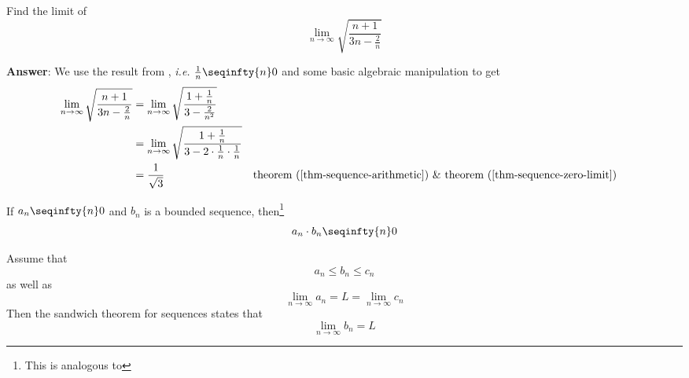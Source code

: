 \begin{exm}\label{exm-sequence-arithmetic:2}
	Find the limit of
	\begin{equation*}
		\lim_{n\to\infty}\sqrt{\frac{n+1}{3n-\frac{2}{n}}}
	\end{equation*}
	\begin{flushleft}
		\textbf{Answer}: We use the result from ,
		\textit{i.e.} $\tfrac{1}{n} \seqinfty{n} 0$ and some basic algebraic manipulation to get
		\begin{align*}
			\lim_{n\to\infty}\sqrt{\frac{n+1}{3n-\frac{2}{n}}}
			 & = \lim_{n\to\infty}\sqrt{\frac{1+\frac{1}{n}}{3-\frac{2}{n^2}}}                                                                                                                    \\
			 & = \lim_{n\to\infty}\sqrt{\frac{1+\frac{1}{n}}{3-2\cdot\frac{1}{n}\cdot\frac{1}{n}}}                                                                                                \\
			 & = \frac{1}{\sqrt{3}}                                                                &  & \text{\pref{theorem}{thm-sequence-arithmetic} \& \pref{theorem}{thm-sequence-zero-limit}}
		\end{align*}
	\end{flushleft}
\end{exm}

\begin{thm}\label{thm-product-of-bounded-zero-sequence}
	If $a_n \seqinfty{n} 0$ and $b_n$ is a bounded sequence, then\footnote{This is
		analogous to }
	\begin{equation*}
		a_n \cdot b_n \seqinfty{n} 0
	\end{equation*}
\end{thm}

\begin{thm}\label{thm-sequence-sandwich-theorem}
	Assume that
	\begin{equation*}
		a_n \leq b_n \leq c_n
	\end{equation*}
	as well as
	\begin{equation*}
		\lim_{n\to\infty} a_n = L = \lim_{n\to\infty} c_n
	\end{equation*}
	Then the sandwich theorem for sequences states that
	\begin{equation*}
		\lim_{n\to\infty} b_n = L
	\end{equation*}
\end{thm}

